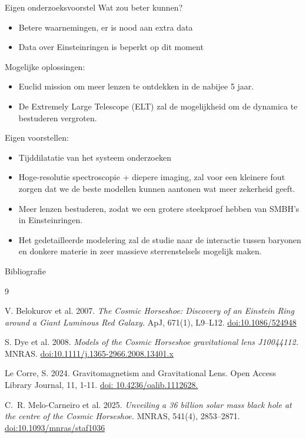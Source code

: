 \documentclass[aspectratio=169,xcolor=dvipsnames]{beamer}
\begin{document}
\begin{frame}{Eigen onderzoeksvoorstel}
    Wat zou beter kunnen?
    \begin{itemize}
        \item Betere waarnemingen, er is nood aan extra data
        \item Data over Einsteinringen is beperkt op dit moment
        
    \end{itemize}

    Mogelijke oplossingen:
    \begin{itemize}
        \item Euclid mission om meer lenzen te ontdekken in de nabijee 5 jaar.
        \item De Extremely Large Telescope (ELT) zal de mogelijkheid om de dynamica te bestuderen vergroten. 
    \end{itemize}
    Eigen voorstellen:
    \begin{itemize}
        \item Tijddilatatie van het systeem onderzoeken 
        \item Hoge-resolutie spectroscopie + diepere imaging, zal voor een kleinere fout zorgen dat we de beste modellen kunnen aantonen wat meer zekerheid geeft.
        \item Meer lenzen bestuderen, zodat we een grotere steekproef hebben van SMBH's in Einsteinringen.
        \item Het gedetailleerde modelering zal de studie naar de interactie tussen baryonen en donkere materie in zeer massieve sterrenstelsels mogelijk maken.
    \end{itemize}

    
\end{frame}


\begin{frame}{Bibliografie}
  \begin{thebibliography}{9}

    V. Belokurov et al. 2007.
    \textit{The Cosmic Horseshoe: Discovery of an Einstein Ring around a Giant Luminous Red Galaxy.}
    ApJ, 671(1), L9–L12.
    \href{https://doi.org/10.1086/524948}{doi:10.1086/524948}

    S. Dye et al. 2008.
    \textit{Models of the Cosmic Horseshoe gravitational lens J10044112.}
    MNRAS.
    \href{https://doi.org/10.1111/j.1365-2966.2008.13401.x}{doi:10.1111/j.1365-2966.2008.13401.x}

    

    Le Corre, S. 2024. Gravitomagnetism and Gravitational Lens. Open Access Library Journal, 11, 1-11. \href{https://www.scirp.org/journal/paperinformation?paperid=138088}{doi: 10.4236/oalib.1112628.}

    C.~R. Melo-Carneiro et al. 2025.
    \textit{Unveiling a 36 billion solar mass black hole at the centre of the Cosmic Horseshoe.}
    MNRAS, 541(4), 2853–2871.
    \href{https://doi.org/10.1093/mnras/staf1036}{doi:10.1093/mnras/staf1036}

    

    
  \end{thebibliography}
\end{frame}
\end{document}
